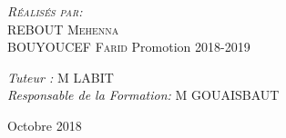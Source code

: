 \documentclass[12pt, a4paper, openany]{report}
\begin{document}
\begin{titlepage}
\begin{sffamily}
\begin{center}
    \begin{minipage}{0.4\textwidth}
      \begin{flushleft} \large
         \textsc{\emph {Réalisés par:} \\REBOUT Mehenna}\\
         \textsc{BOUYOUCEF Farid}   
          \newline
          Promotion 2018-2019 \\
      \end{flushleft}
    \end{minipage}
    \begin{minipage}{0.4\textwidth}
      \begin{flushright} \large
        \emph{Tuteur :}  \textsc{M LABIT}\\
        \emph{Responsable de la Formation:} \textsc{M GOUAISBAUT}
      \end{flushright}
    \end{minipage}

    \vfill

    {\large Octobre 2018}

  \end{center}
  \end{sffamily}      
          
  \end{titlepage}
  
\makeatother




   
\renewcommand{\contentsname}{Sommaire}
\tableofcontents
\listoffigures
\listoftables
 
 
 
 
 
 
 
 
 
\end{document}
